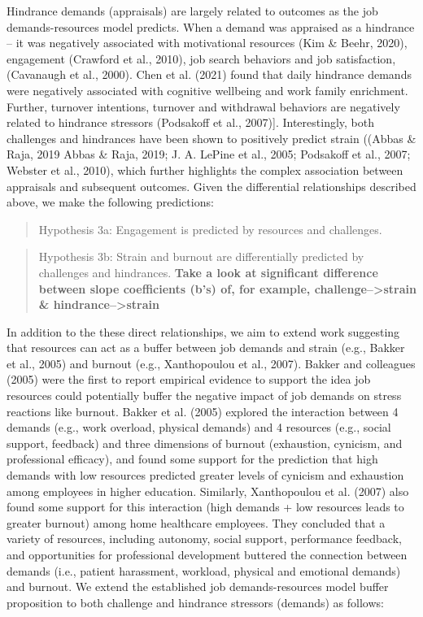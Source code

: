 \documentclass[
  man,mask]{apa7}
\begin{document}
Hindrance demands (appraisals) are largely related to outcomes as the job demands-resources model predicts. When a demand was appraised as a hindrance -- it was negatively associated with motivational resources (Kim \& Beehr, 2020), engagement (Crawford et al., 2010), job search behaviors and job satisfaction, (Cavanaugh et al., 2000). Chen et al. (2021) found that daily hindrance demands were negatively associated with cognitive wellbeing and work family enrichment. Further, turnover intentions, turnover and withdrawal behaviors are negatively related to hindrance stressors (Podsakoff et al., 2007){]}. Interestingly, both challenges and hindrances have been shown to positively predict strain ((Abbas \& Raja, 2019 Abbas \& Raja, 2019; J. A. LePine et al., 2005; Podsakoff et al., 2007; Webster et al., 2010), which further highlights the complex association between appraisals and subsequent outcomes. Given the differential relationships described above, we make the following predictions:

\begin{quote}
Hypothesis 3a: Engagement is predicted by resources and challenges.
\end{quote}

\begin{quote}
Hypothesis 3b: Strain and burnout are differentially predicted by challenges and hindrances. \textbf{Take a look at significant difference between slope coefficients (b's) of, for example, challenge--\textgreater strain \& hindrance--\textgreater strain}
\end{quote}

In addition to the these direct relationships, we aim to extend work suggesting that resources can act as a buffer between job demands and strain (e.g., Bakker et al., 2005) and burnout (e.g., Xanthopoulou et al., 2007). Bakker and colleagues (2005) were the first to report empirical evidence to support the idea job resources could potentially buffer the negative impact of job demands on stress reactions like burnout. Bakker et al. (2005) explored the interaction between 4 demands (e.g., work overload, physical demands) and 4 resources (e.g., social support, feedback) and three dimensions of burnout (exhaustion, cynicism, and professional efficacy), and found some support for the prediction that high demands with low resources predicted greater levels of cynicism and exhaustion among employees in higher education. Similarly, Xanthopoulou et al. (2007) also found some support for this interaction (high demands + low resources leads to greater burnout) among home healthcare employees. They concluded that a variety of resources, including autonomy, social support, performance feedback, and opportunities for professional development buttered the connection between demands (i.e., patient harassment, workload, physical and emotional demands) and burnout. We extend the established job demands-resources model buffer proposition to both challenge and hindrance stressors (demands) as follows:
\end{document}
